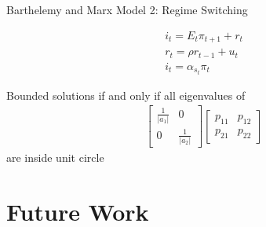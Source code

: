 \documentclass[12pt]{article}
\begin{document}
  {Barthelemy and Marx  Model 2: Regime Switching
\cite{marxbarthelemy2012}}


\cite{troy2007}
\begin{gather}
  \label{eq:4}
  i_t =E_t \pi_{t+1} + r_t\\
r_t= \rho r_{t-1} +u_t\\
i_t=\alpha_{s_t} \pi_t
\end{gather}

Bounded solutions if and only if all eigenvalues of 
\begin{gather}
  \label{eq:5}
  \begin{bmatrix}
    \frac{1}{|a_1|}&0\\
0&    \frac{1}{|a_2|}
  \end{bmatrix}
  \begin{bmatrix}
    p_{11}&p_{12}\\p_{21}&p_{22}
  \end{bmatrix}
\end{gather}
 are inside unit circle





\section{Future Work}
\label{sec:future}
\end{document}
